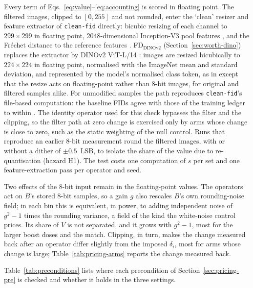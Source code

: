 Every term of Eqs.~\eqref{eq:value}--\eqref{eq:accounting} is scored in
floating point. The filtered images, clipped to $[0, 255]$ and not rounded,
enter the `clean' resizer and feature extractor of \texttt{clean-fid}
\citep{parmar2022aliased} directly: bicubic resizing of each channel to
$299 \times 299$ in floating point, 2048-dimensional Inception-V3 pool
features \citep{szegedy2016rethinking}, and the Fr\'echet distance to the
reference features \citep{heusel2017gans}. FD$_{\text{DINOv2}}$
(Section~\ref{sec:worth-dino}) replaces the extractor by DINOv2 ViT-L/14
\citep{oquab2024dinov2}: images are resized bicubically to $224 \times 224$ in
floating point, normalised with the ImageNet mean and standard deviation, and
represented by the model's normalised class token, as in
\citet{stein2023exposing} except that the resize acts on floating-point rather
than 8-bit images, for original and filtered samples alike. For unmodified samples the path
reproduces \texttt{clean-fid}'s file-based computation: the baseline FIDs
agree with those of the training ledger to within \priceIdentityMaxDiff. The
identity operator used for this check bypasses the filter and the clipping,
so the filter path at zero change is exercised only by arms whose change is
close to zero, such as the static weighting of the null control. Runs that
reproduce an earlier 8-bit measurement round the filtered images, with or
without a dither of $\pm 0.5$~LSB, to isolate the share of the value due to
re-quantisation (hazard H1). The test costs one computation of $s$ per set
and one feature-extraction pass per operator and seed.

Two effects of the 8-bit input remain in the floating-point values. The
operators act on $B$'s stored 8-bit samples, so a gain $g$ also rescales $B$'s
own rounding-noise field; in each bin this is equivalent, in power, to
adding independent noise of $g^2 - 1$ times the rounding variance, a field of
the kind the white-noise control prices. Its share of $V$ is not separated, and
it grows with $g^2 - 1$, most for the larger boost doses and the match.
Clipping, in turn, makes the change measured back after an operator differ
slightly from the imposed $\delta_i$, most for arms whose change is large;
Table~\ref{tab:pricing-arms} reports the change measured back.

Table~\ref{tab:preconditions} lists where each precondition of
Section~\ref{sec:pricing-pre} is checked and whether it holds in the three
settings.

